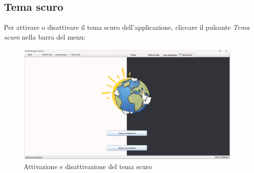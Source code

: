 \subsection{Tema scuro}
Per attivare o disattivare il tema scuro dell'applicazione, cliccare il pulsante \emph{Tema scuro} nella barra del menu:
\begin{figure}[H]
    \centering
    \includegraphics[width=1\textwidth]{../../img/tema_scuro.png}
    \caption{Attivazione e disattivazione del tema scuro}
\end{figure}